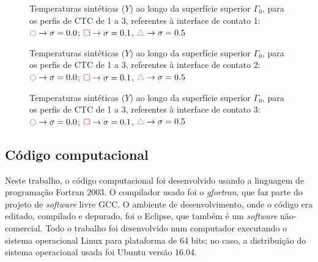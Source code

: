\begin{figure}[h!b]
	\caption{Temperaturas sintéticas ($Y$) ao longo da superfície superior $\Gamma_0$, para os perfis de CTC de 1 a 3, referentes à interface de contato 1: $\textcolor{blue}{\ocircle} \rightarrow \sigma = 0.0$; $\textcolor{red}{\square} \rightarrow \sigma = 0.1$, $\textcolor{gray}{\triangle} \rightarrow \sigma = 0.5$}
	\label{figura_temperaturas_sinteticas_interface_01}
\end{figure}
\begin{figure}[h!b]
	\caption{Temperaturas sintéticas ($Y$) ao longo da superfície superior $\Gamma_0$, para os perfis de CTC de 1 a 3, referentes à interface de contato 2: $\textcolor{blue}{\ocircle} \rightarrow \sigma = 0.0$; $\textcolor{red}{\square} \rightarrow \sigma = 0.1$, $\textcolor{gray}{\triangle} \rightarrow \sigma = 0.5$}
	\label{figura_temperaturas_sinteticas_interface_02}
\end{figure}
\begin{figure}[h!b]
	\caption{Temperaturas sintéticas ($Y$) ao longo da superfície superior $\Gamma_0$, para os perfis de CTC de 1 a 3, referentes à interface de contato 3: $\textcolor{blue}{\ocircle} \rightarrow \sigma = 0.0$; $\textcolor{red}{\square} \rightarrow \sigma = 0.1$, $\textcolor{gray}{\triangle} \rightarrow \sigma = 0.5$}
	\label{figura_temperaturas_sinteticas_interface_03}
\end{figure}

\subsection{Código computacional}\label{sobre_o_programa}

Neste trabalho, o código computacional foi desenvolvido usando a linguagem de programação Fortran 2003. O compilador usado foi o \textit{gfortran}, que faz parte do projeto de \textit{software} livre GCC. O ambiente de desenvolvimento, onde o código era editado, compilado e depurado, foi o Eclipse, que também é um \textit{software} não-comercial. Todo o trabalho foi desenvolvido num computador executando o sistema operacional Linux para plataforma de 64 bits; no caso, a distribuição do sistema operacional usada foi Ubuntu versão 16.04.

